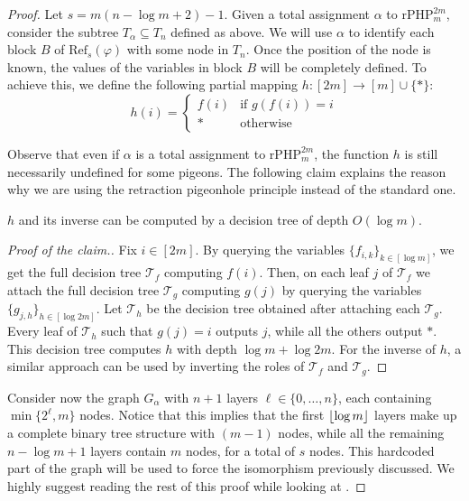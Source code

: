 \begin{proof}
    Let $s = m(n-\log m +2)-1$. Given a total assignment $\alpha$ to $\mathrm{rPHP}^{2m}_m$, consider the subtree $T_\alpha \subseteq T_n$ defined as above. We will use $\alpha$ to identify each block $B$ of $\mathrm{Ref}_{s}(\varphi)$ with some node in $T_n$. Once the position of the node is known, the values of the variables in block $B$ will be completely defined. To achieve this, we define the following partial mapping $h : [2m] \to [m] \cup \{*\}$:
    \begin{equation}
        h(i) = \left \{ \begin{array}{ll}
            f(i) & \text{if } g(f(i)) = i \\
            * & \text{otherwise}
        \end{array}\right .
    \end{equation}
        
    Observe that even if $\alpha$ is a total assignment to $\mathrm{rPHP}_m^{2m}$, the function $h$ is still necessarily undefined for some pigeons. The following claim explains the reason why we are using the retraction pigeonhole principle instead of the standard one.
    
    \begin{claim}
        $h$ and its inverse can be computed by a decision tree of depth $O(\log m)$.
    \end{claim} 

    \begin{proof}[Proof of the claim.]
        Fix $i \in [2m]$. By querying the variables $\{f_{i,k}\}_{k \in [\log m]}$, we get the full decision tree $\mathcal{T}_f$ computing $f(i)$. Then, on each leaf $j$ of $\mathcal{T}_f$ we attach the full decision tree $\mathcal{T}_g$ computing $g(j)$ by querying the variables $\{g_{j,h}\}_{h \in [\log 2m]}$. Let $\mathcal{T}_h$ be the decision tree obtained after attaching each $\mathcal{T}_g$. Every leaf of $\mathcal{T}_h$ such that $g(j) = i$ outputs $j$, while all the others output $*$. This decision tree computes $h$ with depth $\log m + \log 2m$. For the inverse of $h$, a similar approach can be used by inverting the roles of $\mathcal{T}_f$ and $\mathcal{T}_g$.
    \end{proof}

    Consider now the graph $G_\alpha$ with $n+1$ layers $\ell \in \{0, \ldots, n\}$, each containing $\min\{2^{\ell}, m\}$ nodes. Notice that this implies that the first $\left \lfloor \log m \right \rfloor$ layers make up a complete binary tree structure with $(m-1)$ nodes, while all the remaining $n - \log m +1$ layers contain $m$ nodes, for a total of $s$ nodes. This hardcoded part of the graph will be used to force the isomorphism previously discussed. We highly suggest reading the rest of this proof while looking at .



\end{proof}
